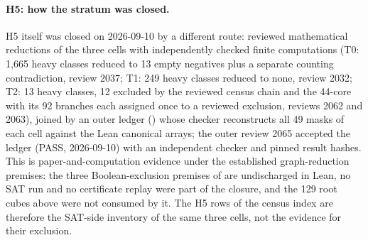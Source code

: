 \documentclass{anvil-paper}
\newcommand{\repobase}{https://github.com/rjwalters/lean-genius/blob/erdos85/integration}
\newcommand{\repofile}[2]{\href{\repobase/#1}{\lean{#2}}}
\theoremstyle{definition}
\begin{document}
\paragraph{H5: how the stratum was closed.} H5 itself was closed on 2026-09-10 by a different route: reviewed mathematical reductions of the three cells with independently checked finite computations (T0: 1,665 heavy classes reduced to 13 empty negatives plus a separate counting contradiction, review 2037; T1: 249 heavy classes reduced to none, review 2032; T2: 13 heavy classes, 12 excluded by the reviewed census chain and the 44-core with its 92 branches each assigned once to a reviewed exclusion, reviews 2062 and 2063), joined by an outer ledger (\repofile{research/problems/erdos-85-wip-01/q7_h5_closure_ledger/}{q7_h5_closure_ledger/}) whose checker reconstructs all 49 masks of each cell against the Lean canonical arrays; the outer review 2065 accepted the ledger (PASS, 2026-09-10) with an independent checker and pinned result hashes. This is paper-and-computation evidence under the established graph-reduction premises: the three Boolean-exclusion premises of  are undischarged in Lean, no SAT run and no certificate replay were part of the closure, and the 129 root cubes above were not consumed by it. The H5 rows of the census index are therefore the SAT-side inventory of the same three cells, not the evidence for their exclusion.
\end{document}
